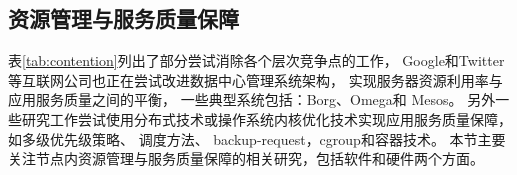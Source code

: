 

\subsection{资源管理与服务质量保障}

表\ref{tab:contention}列出了部分尝试消除各个层次竞争点的工作，
Google和Twitter等互联网公司也正在尝试改进数据中心管理系统架构，
实现服务器资源利用率与应用服务质量之间的平衡，
一些典型系统包括：Borg\cite{borg:2015}、Omega\cite{Schwarzkopf_omega_2013}和
Mesos\cite{Hindman:2011:Mesos}。
另外一些研究工作尝试使用分布式技术或操作系统内核优化技术实现应用服务质量保障，
如多级优先级策略\cite{google_trace}、
调度方法\cite{delimitrou_paragon:_2013, delimitrou_quasar:_2014,  mars_heterogeneity_2011,
kozyrakis_reconciling_2014, Novakovi:ATC2013}、
backup-request\cite{dean_tail_2013}，cgroup\cite{cgroup}和容器技术\cite{lxc}。 
本节主要关注节点内资源管理与服务质量保障的相关研究，包括软件和硬件两个方面。

